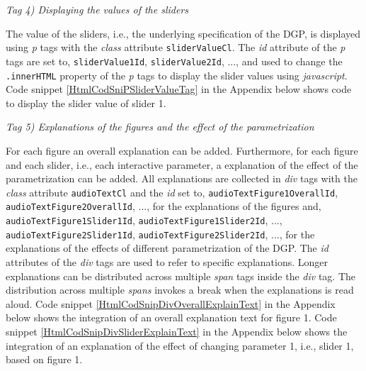\documentclass[12pt]{article}
\begin{document}

\vspace{1em}
\noindent\emph{Tag 4) Displaying the values of the sliders}

The value of the sliders, i.e., the underlying specification of the DGP, is displayed using \emph{p} tags with the \emph{class} attribute \texttt{sliderValueCl}. 
%
The \emph{id} attribute of the \emph{p} tags are set to, \texttt{sliderValue1Id}, \texttt{sliderValue2Id}, ..., and used to change the \texttt{.innerHTML} property of the \emph{p} tags to display the slider values using \emph{javascript}. 
%
Code snippet \ref{HtmlCodSniPSliderValueTag} in the Appendix below shows code to display the slider value of slider 1. 


\vspace{1em}
\noindent\emph{Tag 5) Explanations of the figures and the effect of the parametrization}

For each figure an overall explanation can be added. 
% 
Furthermore, for each figure and each slider, i.e., each interactive parameter, a explanation of the effect of the parametrization can be added. 
%
All explanations are collected in \emph{div} tags with the \emph{class} attribute \texttt{audioTextCl} and the \emph{id} set to, \texttt{audioTextFigure1OverallId}, \texttt{audioTextFigure2OverallId}, ..., for the explanations of the figures and, \\ \texttt{audioTextFigure1Slider1Id}, \texttt{audioTextFigure1Slider2Id}, ..., \\ \texttt{audioTextFigure2Slider1Id}, \texttt{audioTextFigure2Slider2Id}, ..., for the explanations of the effects of different parametrization of the DGP. 
%
The \emph{id} attributes of the \emph{div} tags are used to refer to specific explanations. 
%
Longer explanations can be distributed across multiple \emph{span} tags inside the \emph{div} tag. 
%
The distribution across multiple \emph{spans} invokes a break when the explanations is read aloud. 
%
Code snippet \ref{HtmlCodSnipDivOverallExplainText} in the Appendix below shows the integration of an overall explanation text for figure 1. 
%
Code snippet \ref{HtmlCodSnipDivSliderExplainText} in the Appendix below shows the integration of an explanation of the effect of changing parameter 1, i.e., slider 1, based on figure 1. 
\end{document}
